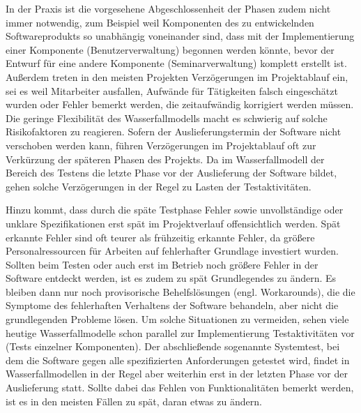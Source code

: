 \vspace{0.6mm} %

In der Praxis ist die vorgesehene Abgeschlossenheit der Phasen zudem nicht immer notwendig, zum Beispiel weil Komponenten des zu entwickelnden Softwareprodukts so unabhängig voneinander sind, dass mit der Implementierung einer Komponente (\zb Benutzerverwaltung) begonnen werden könnte, bevor der Entwurf für eine andere Komponente (\zb Seminarverwaltung) komplett erstellt ist. Außerdem  treten in den meisten Projekten Verzögerungen im Projektablauf ein, sei es weil Mitarbeiter ausfallen, Aufwände für Tätigkeiten falsch eingeschätzt wurden oder Fehler bemerkt werden, die zeitaufwändig korrigiert werden müssen. Die geringe Flexibilität des Wasserfallmodells macht es schwierig auf solche Risikofaktoren zu reagieren. Sofern der Auslieferungstermin der Software nicht verschoben werden kann, führen Verzögerungen im Projektablauf oft zur Verkürzung der späteren Phasen des Projekts. Da im Wasserfallmodell der Bereich des Testens die letzte Phase vor der Auslieferung der Software bildet, gehen solche Verzögerungen in der Regel zu Lasten der Testaktivitäten.

\vspace{0.6mm} %

Hinzu kommt, dass durch die späte Testphase 
Fehler sowie unvollständige oder unklare Spezifikationen erst spät im Projektverlauf offensichtlich werden. Spät erkannte Fehler sind oft teurer als frühzeitig erkannte Fehler, da größere Personalressourcen für Arbeiten auf fehlerhafter Grundlage investiert wurden. Sollten beim Testen oder auch erst im Betrieb noch größere Fehler in der Software entdeckt werden, ist es zudem zu spät Grundlegendes zu ändern. Es bleiben dann nur noch provisorische Behelfslösungen (engl. Workarounds), die die Symptome des fehlerhaften Verhaltens der Software behandeln, aber nicht die grundlegenden Probleme lösen. Um solche Situationen zu vermeiden, sehen viele heutige Wasserfallmodelle schon parallel zur Implementierung Testaktivitäten vor (\zb Tests einzelner Komponenten). Der abschließende sogenannte Systemtest, bei dem die Software gegen alle spezifizierten Anforderungen getestet wird, findet in Wasserfallmodellen in der Regel aber weiterhin erst in der letzten Phase vor der Auslieferung statt. Sollte dabei das Fehlen von Funktionalitäten bemerkt werden, ist es in den meisten Fällen zu spät, daran etwas zu ändern.


